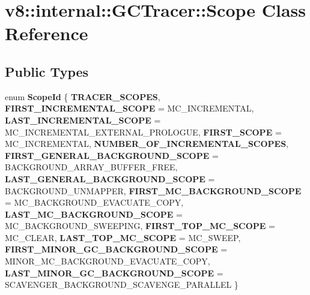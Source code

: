 \hypertarget{classv8_1_1internal_1_1GCTracer_1_1Scope}{}\section{v8\+:\+:internal\+:\+:G\+C\+Tracer\+:\+:Scope Class Reference}
\label{classv8_1_1internal_1_1GCTracer_1_1Scope}
\subsection*{Public Types}
\begin{DoxyCompactItemize}
\item 
\mbox{\label{classv8_1_1internal_1_1GCTracer_1_1Scope_a6702624408f5af3d30559d5d02371891}} 
enum {\bfseries Scope\+Id} \{ \newline
{\bfseries T\+R\+A\+C\+E\+R\+\_\+\+S\+C\+O\+P\+ES}, 
{\bfseries F\+I\+R\+S\+T\+\_\+\+I\+N\+C\+R\+E\+M\+E\+N\+T\+A\+L\+\_\+\+S\+C\+O\+PE} = M\+C\+\_\+\+I\+N\+C\+R\+E\+M\+E\+N\+T\+AL, 
{\bfseries L\+A\+S\+T\+\_\+\+I\+N\+C\+R\+E\+M\+E\+N\+T\+A\+L\+\_\+\+S\+C\+O\+PE} = M\+C\+\_\+\+I\+N\+C\+R\+E\+M\+E\+N\+T\+A\+L\+\_\+\+E\+X\+T\+E\+R\+N\+A\+L\+\_\+\+P\+R\+O\+L\+O\+G\+UE, 
{\bfseries F\+I\+R\+S\+T\+\_\+\+S\+C\+O\+PE} = M\+C\+\_\+\+I\+N\+C\+R\+E\+M\+E\+N\+T\+AL, 
\newline
{\bfseries N\+U\+M\+B\+E\+R\+\_\+\+O\+F\+\_\+\+I\+N\+C\+R\+E\+M\+E\+N\+T\+A\+L\+\_\+\+S\+C\+O\+P\+ES}, 
{\bfseries F\+I\+R\+S\+T\+\_\+\+G\+E\+N\+E\+R\+A\+L\+\_\+\+B\+A\+C\+K\+G\+R\+O\+U\+N\+D\+\_\+\+S\+C\+O\+PE} = B\+A\+C\+K\+G\+R\+O\+U\+N\+D\+\_\+\+A\+R\+R\+A\+Y\+\_\+\+B\+U\+F\+F\+E\+R\+\_\+\+F\+R\+EE, 
{\bfseries L\+A\+S\+T\+\_\+\+G\+E\+N\+E\+R\+A\+L\+\_\+\+B\+A\+C\+K\+G\+R\+O\+U\+N\+D\+\_\+\+S\+C\+O\+PE} = B\+A\+C\+K\+G\+R\+O\+U\+N\+D\+\_\+\+U\+N\+M\+A\+P\+P\+ER, 
{\bfseries F\+I\+R\+S\+T\+\_\+\+M\+C\+\_\+\+B\+A\+C\+K\+G\+R\+O\+U\+N\+D\+\_\+\+S\+C\+O\+PE} = M\+C\+\_\+\+B\+A\+C\+K\+G\+R\+O\+U\+N\+D\+\_\+\+E\+V\+A\+C\+U\+A\+T\+E\+\_\+\+C\+O\+PY, 
\newline
{\bfseries L\+A\+S\+T\+\_\+\+M\+C\+\_\+\+B\+A\+C\+K\+G\+R\+O\+U\+N\+D\+\_\+\+S\+C\+O\+PE} = M\+C\+\_\+\+B\+A\+C\+K\+G\+R\+O\+U\+N\+D\+\_\+\+S\+W\+E\+E\+P\+I\+NG, 
{\bfseries F\+I\+R\+S\+T\+\_\+\+T\+O\+P\+\_\+\+M\+C\+\_\+\+S\+C\+O\+PE} = M\+C\+\_\+\+C\+L\+E\+AR, 
{\bfseries L\+A\+S\+T\+\_\+\+T\+O\+P\+\_\+\+M\+C\+\_\+\+S\+C\+O\+PE} = M\+C\+\_\+\+S\+W\+E\+EP, 
{\bfseries F\+I\+R\+S\+T\+\_\+\+M\+I\+N\+O\+R\+\_\+\+G\+C\+\_\+\+B\+A\+C\+K\+G\+R\+O\+U\+N\+D\+\_\+\+S\+C\+O\+PE} = M\+I\+N\+O\+R\+\_\+\+M\+C\+\_\+\+B\+A\+C\+K\+G\+R\+O\+U\+N\+D\+\_\+\+E\+V\+A\+C\+U\+A\+T\+E\+\_\+\+C\+O\+PY, 
\newline
{\bfseries L\+A\+S\+T\+\_\+\+M\+I\+N\+O\+R\+\_\+\+G\+C\+\_\+\+B\+A\+C\+K\+G\+R\+O\+U\+N\+D\+\_\+\+S\+C\+O\+PE} = S\+C\+A\+V\+E\+N\+G\+E\+R\+\_\+\+B\+A\+C\+K\+G\+R\+O\+U\+N\+D\+\_\+\+S\+C\+A\+V\+E\+N\+G\+E\+\_\+\+P\+A\+R\+A\+L\+L\+EL
 \}
\end{DoxyCompactItemize}
